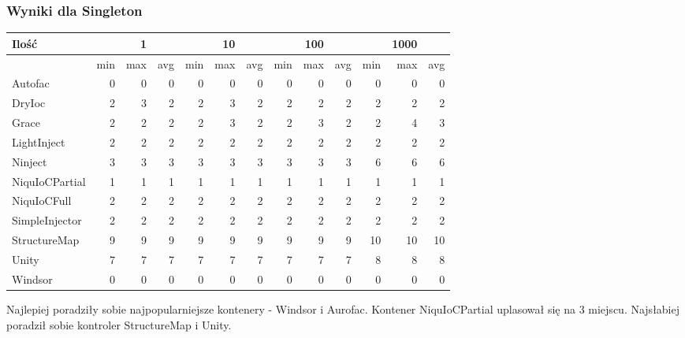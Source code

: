 \documentclass[12pt]{article}
\begin{document}
\subsubsection{Wyniki dla Singleton}
\begin{center}
\begin{small}
	\begin{tabular}{ | l | r r r | r r r | r r r | r r r | }
    		\hline
     		Ilość & & 1 & & & 10 & & & 100 & & & 1000 & \\ \hline
     		 & min & max & avg & min & max & avg & min & max & avg & min & max & avg \\ \hline
    		Autofac & 0 & 0 & 0 & 0 & 0 & 0 & 0 & 0 & 0 & 0 & 0 & 0 \\ \hline
   		DryIoc & 2 & 3 & 2 & 2 & 3 & 2 & 2 & 2 & 2 & 2 & 2 & 2 \\ \hline
		Grace & 2 & 2 & 2 & 2 & 3 & 2 & 2 & 3 & 2 & 2 & 4 & 3 \\ \hline
		LightInject & 2 & 2 & 2 & 2 & 2 & 2 & 2 & 2 & 2 & 2 & 2 & 2 \\ \hline
		Ninject & 3 & 3 & 3 & 3 & 3 & 3 & 3 & 3 & 3 & 6 & 6 & 6 \\ \hline
		NiquIoCPartial & 1 & 1 & 1 & 1 & 1 & 1 & 1 & 1 & 1 & 1 & 1 & 1 \\ \hline
		NiquIoCFull & 2 & 2 & 2 & 2 & 2 & 2 & 2 & 2 & 2 & 2 & 2 & 2 \\ \hline
		SimpleInjector & 2 & 2 & 2 & 2 & 2 & 2 & 2 & 2 & 2 & 2 & 2 & 2 \\ \hline
		StructureMap & 9 & 9 & 9 & 9 & 9 & 9 & 9 & 9 & 9 & 10 & 10 & 10 \\ \hline
		Unity & 7 & 7 & 7 & 7 & 7 & 7 & 7 & 7 & 7 & 8 & 8 & 8 \\ \hline
		Windsor & 0 & 0 & 0 & 0 & 0 & 0 & 0 & 0 & 0 & 0 & 0 & 0 \\
    		\hline
  	\end{tabular}
\end{small}
\end{center}

Najlepiej poradziły sobie najpopularniejsze kontenery - Windsor i Aurofac. Kontener NiquIoCPartial uplasował się na 3 miejscu. Najsłabiej poradził sobie kontroler StructureMap i Unity.
\end{document}
